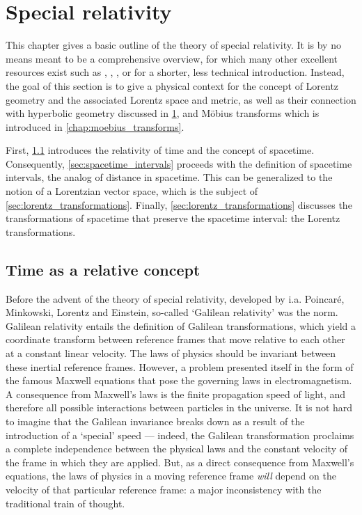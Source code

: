 \chapter{Special relativity}
\label{chap:relativity}
This chapter gives a basic outline of the theory of special relativity. It is by no means meant to be a comprehensive overview, for which many other excellent resources exist such as \citet{Misner1970}, \citet{Taylor1992}, \citet{Landau1971}, or \citet{Penrose1978} for a shorter, less technical introduction. Instead, the goal of this section is to give a physical context for the concept of Lorentz geometry and the associated Lorentz space and metric, as well as their connection with hyperbolic geometry discussed in \cref{chap:relativity}, and Möbius transforms which is introduced in \cref{chap:moebius_transforms}.

First, \cref{sec:time_relative} introduces the relativity of time and the concept of spacetime. Consequently, \cref{sec:spacetime_intervals} proceeds with the definition of spacetime intervals, the analog of distance in spacetime. This can be generalized to the notion of a Lorentzian vector space, which is the subject of \cref{sec:lorentz_transformations}. Finally, \cref{sec:lorentz_transformations} discusses the transformations of spacetime that preserve the spacetime interval: the Lorentz transformations.

\section{Time as a relative concept}
\label{sec:time_relative}
Before the advent of the theory of special relativity, developed by i.a. Poincaré, Minkowski, Lorentz and Einstein, so-called `Galilean relativity' was the norm. Galilean relativity entails the definition of Galilean transformations, which yield a coordinate transform between reference frames that move relative to each other at a constant linear velocity. The laws of physics should be invariant between these inertial reference frames. However, a problem presented itself in the form of the famous Maxwell equations that pose the governing laws in electromagnetism. A consequence from Maxwell's laws is the finite propagation speed of light, and therefore all possible interactions between particles in the universe. It is not hard to imagine that the Galilean invariance breaks down as a result of the introduction of a `special' speed --- indeed, the Galilean transformation proclaims a complete independence between the physical laws and the constant velocity of the frame in which they are applied. But, as a direct consequence from Maxwell's equations, the laws of physics in a moving reference frame \emph{will} depend on the velocity of that particular reference frame: a major inconsistency with the traditional train of thought.

